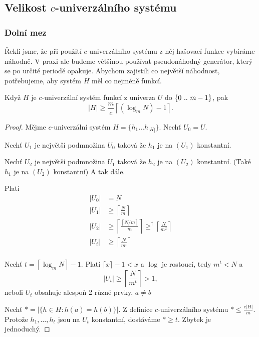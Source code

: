 \subsection{Velikost $c$-univerzálního systému}

\subsubsection{Dolní mez}
Řekli jsme, že při použití $c$-univerzálního systému z něj hašovací
funkce vybíráme náhodně. V praxi ale budeme většinou používat
pseudonáhodný generátor, který se po určité periodě opakuje. Abychom 
zajistili co největší náhodnost,
potřebujeme, aby systém \( H \) měl co nejméně funkcí.

\begin{theorem}
Když $H$ je $c$-univerzální systém
funkcí z univerza $U$ do $\{{0}\ ..\ {m-1}\}$, pak 
\[ |H| \geq \frac{m}{c} \left\lceil (\log_m N) - 1 \right\rceil. \]
\end{theorem}
\begin{proof}
Mějme $c$-univerzální systém \( H = \{h_1 \ldots h_{|H|} \} \).
Nechť $U_0 = U$.

Nechť $U_1$ je největší podmnožina $U_0$ taková že $h_1$ je na $(U_1)$
konstantní.

Nechť $U_2$ je největší podmnožina $U_1$ taková že $h_2$ je na $(U_2)$
konstantní. (Také $h_1$ je na $(U_2)$ konstantní) A tak dále.

Platí
\begin{align*}
|U_0| & = N \\
|U_1| & \geq \left\lceil \frac Nm \right\rceil \\
|U_2| & \geq \left\lceil \frac {\left\lceil N/m \right\rceil}m \right\rceil 
	\geq^\dag \left\lceil \frac N{m^2} \right\rceil \\
|U_i| & \geq \left\lceil \frac N{m^i} \right\rceil \\
\end{align*}

Nechť $t =  \left\lceil \log_m N \right\rceil - 1$. 
Platí $\lceil x \rceil - 1 < x$ a $\log$ je rostoucí, tedy $m^t < N$ a 
\[
|U_t| \geq \left\lceil \frac N{m^t} \right\rceil > 1,
\]
neboli $U_t$ obsahuje alespoň 2 různé prvky, $a \ne b$

Nechť $* = |\{ h \in H : h(a) = h(b) \}|$. 
Z definice $c$-univerzálního systému $* \leq \frac {c|H|}m$. 
Protože $h_1, \ldots, h_t$ jsou na $U_t$ konstantní, dostáváme $* \geq t$.
Zbytek je jednoduchý.
\end{proof}

